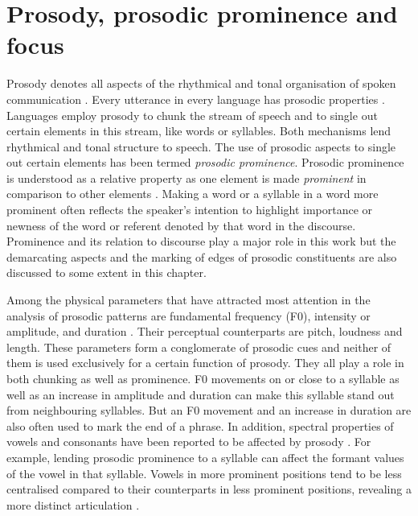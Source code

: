 \chapter{Prosody, prosodic prominence and focus}
\label{chapter_prosody}

Prosody denotes all aspects of the rhythmical and tonal organisation of spoken communication \citep{Calhoun2007}. Every utterance in every language has prosodic properties \citep{Grice2006}. Languages employ prosody to chunk the stream of speech and to single out certain elements in this stream, like words or syllables. Both mechanisms lend rhythmical and tonal structure to speech. The use of prosodic aspects to single out certain elements has been termed \emph{prosodic prominence}. Prosodic prominence is understood as a relative property as one element is made \emph{prominent} in comparison to other elements \citep{WagnerWatson2010}. Making a word or a syllable in a word more prominent often reflects the speaker's intention to highlight importance or newness of the word or referent denoted by that word in the discourse. Prominence and its relation to discourse play a major role in this work but the demarcating aspects and the marking of edges of prosodic constituents are also discussed to some extent in this chapter.

Among the physical parameters that have attracted most attention in the analysis of prosodic patterns are fundamental frequency (F0), intensity or amplitude, and duration \citep{Ladd2008, Grice2006}. Their perceptual counterparts are pitch, loudness and length. These parameters form a conglomerate of prosodic cues and neither of them is used exclusively for a certain function of prosody. They all play a role in both chunking as well as prominence. F0 movements on or close to a syllable as well as an increase in amplitude and duration can make this syllable stand out from neighbouring syllables. But an F0 movement and an increase in duration are also often used to mark the end of a phrase. In addition, spectral properties of vowels and consonants have been reported to be affected by prosody \citep{Cho2011, Gussenhoven2004}. For example, lending prosodic prominence to a syllable can affect the formant values of the vowel in that syllable. Vowels in more prominent positions tend to be less centralised compared to their counterparts in less prominent positions, revealing a more distinct articulation \citep{DeJong1995, Cho2005, Mücke2018}.


